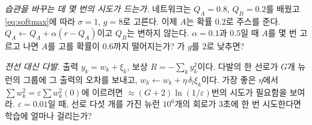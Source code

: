 \begin{exercise}[\lvlA]
\label{ex:10:6}
\emph{습관을 바꾸는 데 몇 번의 시도가 드는가.} 네트워크는 $Q_A=0.8$, $Q_B=0.2$를 배웠고 \eqref{eq:softmax}에 따라 $\sigma=1$, $g=8$로 고른다. 이제 $A$는 확률 $0.2$로 주스를 준다. $Q_A\leftarrow Q_A+\alpha(r-Q_A)$이고 $Q_B$는 변하지 않는다. $\alpha=0.1$과 $0.5$일 때 $A$를 몇 번 고르고 나면 $A$를 고를 확률이 $0.6$까지 떨어지는가? 가 $g$를 $2$로 낮추면?
\end{exercise}

\begin{exercise}[\lvlC]
\label{ex:10:7}
\emph{전선 대신 다발.} 출력 $y_k=w_k+\xi_k$, 보상 $R=-\sum_ky_k^2$이다. 다발의 한 선로가 $G$개 뉴런의 그룹에 그 출력의 오차를 보내고, $w_k\leftarrow w_k+\eta\,\delta_l\xi_k$이다. 가장 좋은 $\eta$에서 $\sum w_k^2=\varepsilon\sum w_k^2(0)$에 이르려면 $\approx(G+2)\ln(1/\varepsilon)$번의 시도가 필요함을 보여라. $\varepsilon=0.01$일 때, 선로 다섯 개를 가진 뉴런 $10^6$개의 회로가 3초에 한 번 시도한다면 학습에 얼마나 걸리는가?
\end{exercise}
